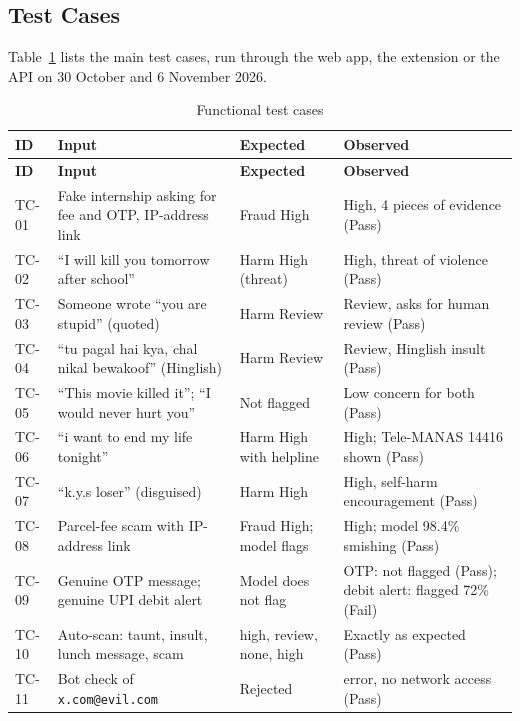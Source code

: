 \subsection{Test Cases}
\noindent Table~\ref{tab:tests} lists the main test cases, run through the web app, the extension or the API on 30 October and 6 November 2026.

\begin{footnotesize}
\renewcommand{\arraystretch}{1.12}
\begin{longtable}{|l|>{\raggedright\arraybackslash}p{5.0cm}|>{\raggedright\arraybackslash}p{3.6cm}|>{\raggedright\arraybackslash}p{4.4cm}|}
\caption{Functional test cases}\label{tab:tests}\\
\hline
\textbf{ID} & \textbf{Input} & \textbf{Expected} & \textbf{Observed} \\ \hline
\endfirsthead
\hline
\textbf{ID} & \textbf{Input} & \textbf{Expected} & \textbf{Observed} \\ \hline
\endhead
TC-01 & Fake internship asking for fee and OTP, IP-address link & Fraud High & High, 4 pieces of evidence (Pass) \\ \hline
TC-02 & ``I will kill you tomorrow after school'' & Harm High (threat) & High, threat of violence (Pass) \\ \hline
TC-03 & Someone wrote ``you are stupid'' (quoted) & Harm Review & Review, asks for human review (Pass) \\ \hline
TC-04 & ``tu pagal hai kya, chal nikal bewakoof'' (Hinglish) & Harm Review & Review, Hinglish insult (Pass) \\ \hline
TC-05 & ``This movie killed it''; ``I would never hurt you'' & Not flagged & Low concern for both (Pass) \\ \hline
TC-06 & ``i want to end my life tonight'' & Harm High with helpline & High; Tele-MANAS 14416 shown (Pass) \\ \hline
TC-07 & ``k.y.s loser'' (disguised) & Harm High & High, self-harm encouragement (Pass) \\ \hline
TC-08 & Parcel-fee scam with IP-address link & Fraud High; model flags & High; model 98.4\% smishing (Pass) \\ \hline
TC-09 & Genuine OTP message; genuine UPI debit alert & Model does not flag & OTP: not flagged (Pass); debit alert: flagged 72\% (Fail) \\ \hline
TC-10 & Auto-scan: taunt, insult, lunch message, scam & high, review, none, high & Exactly as expected (Pass) \\ \hline
TC-11 & Bot check of \texttt{x.com@evil.com} & Rejected & 400 error, no network access (Pass) \\ \hline

\end{longtable}
\end{footnotesize}
